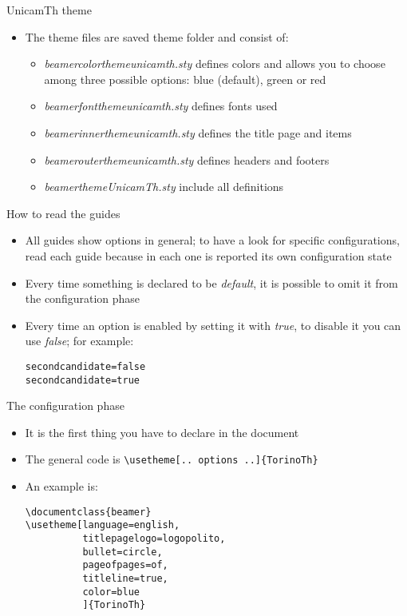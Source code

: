 \begin{tframe}{UnicamTh theme}
\begin{itemize}
\item The theme files are saved theme folder and consist of:
\begin{itemize}
\item \emph{beamercolorthemeunicamth.sty} defines colors and allows you to choose among three possible options: blue (default), green or red
\item \emph{beamerfontthemeunicamth.sty} defines fonts used
\item \emph{beamerinnerthemeunicamth.sty} defines the title page and items
\item \emph{beamerouterthemeunicamth.sty} defines headers and footers
\item \emph{beamerthemeUnicamTh.sty} include all definitions
\end{itemize}
\end{itemize}
\end{tframe}


\begin{frame}[t,fragile]{How to read the guides}
\begin{itemize}
\item All guides show options in general; to have a look for specific configurations, read each guide because in each one is reported its own configuration state
\item Every time something is declared to be \emph{default}, it is possible to omit it from the configuration phase
\item Every time an option is enabled by setting it with \emph{true}, to disable it you can use \emph{false}; for example:
\begin{verbatim}
secondcandidate=false 
secondcandidate=true 
\end{verbatim}
\end{itemize}
\end{frame}

\begin{frame}[t,fragile]{The configuration phase}
\begin{itemize}
\item It is the first thing you have to declare in the document
\item The general code is \verb!\usetheme[.. options ..]{TorinoTh}!
\item An example is:
\begin{verbatim}
\documentclass{beamer}
\usetheme[language=english,
          titlepagelogo=logopolito,
          bullet=circle,
          pageofpages=of,
          titleline=true,
          color=blue
          ]{TorinoTh}
\end{verbatim}
\end{itemize}
\end{frame}

